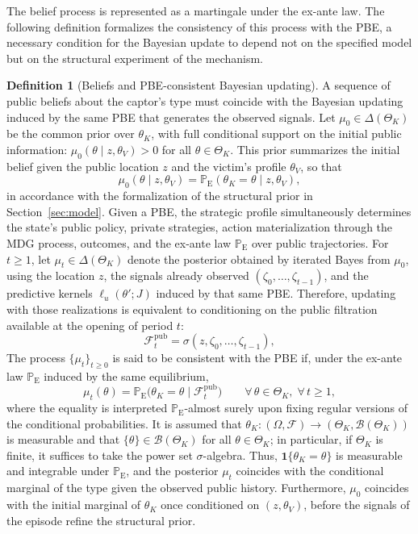 \documentclass[review,authoryear,12pt]{elsarticle}
\theoremstyle{plain}
\theoremstyle{definition}
\newtheorem{definition}[theorem]{Definition}
\newcommand{\ProbE}{\mathbb{P}_{\mathrm{E}}}
\newcommand{\ThetaK}{\Theta_K}
\newcommand{\1}{\mathbf{1}}
\begin{document}
The belief process is represented as a martingale under the ex-ante law. The following definition formalizes the consistency of this process with the PBE, a necessary condition for the Bayesian update to depend not on the specified model but on the structural experiment of the mechanism.

\begin{definition}[Beliefs and PBE-consistent Bayesian updating]\label{def:beliefs-martingale}
A sequence of public beliefs about the captor's type must coincide with the Bayesian updating induced by the same PBE that generates the observed signals. Let $\mu_0\in\Delta(\ThetaK)$ be the common prior over $\theta_K$, with full conditional support on the initial public information: $\mu_0(\theta \mid z,\theta_V)>0$ for all $\theta\in\ThetaK$. This prior summarizes the initial belief given the public location $z$ and the victim's profile $\theta_V$, so that
\[
\mu_0(\theta \mid z,\theta_V)=\ProbE(\theta_K=\theta\mid z,\theta_V),
\]
in accordance with the formalization of the structural prior in Section~\ref{sec:model}. Given a PBE, the strategic profile simultaneously determines the state's public policy, private strategies, action materialization through the MDG process, outcomes, and the ex-ante law $\ProbE$ over public trajectories. For $t\ge 1$, let $\mu_t\in\Delta(\ThetaK)$ denote the posterior obtained by iterated Bayes from $\mu_0$, using the location $z$, the signals already observed $(\zeta_0,\ldots,\zeta_{t-1})$, and the predictive kernels $\ell_u(\theta';J)$ induced by that same PBE. Therefore, updating with those realizations is equivalent to conditioning on the public filtration available at the opening of period $t$:
\[
\mathcal{F}_t^{\mathrm{pub}}=\sigma(z,\zeta_0,\ldots,\zeta_{t-1}),
\]
The process $\{\mu_t\}_{t\ge 0}$ is said to be consistent with the PBE if, under the ex-ante law $\ProbE$ induced by the same equilibrium,
\begin{equation}
\label{eq:beliefs-ebp-consistency}
\mu_t(\theta)=\ProbE\bigl(\theta_K=\theta\mid\mathcal{F}_t^{\mathrm{pub}}\bigr)\qquad \forall\,\theta\in\ThetaK,\;\forall\,t\ge 1,
\end{equation}
where the equality is interpreted $\ProbE$-almost surely upon fixing regular versions of the conditional probabilities. It is assumed that $\theta_K:(\Omega,\mathcal{F})\to(\ThetaK,\mathcal{B}(\ThetaK))$ is measurable and that $\{\theta\}\in\mathcal{B}(\ThetaK)$ for all $\theta\in\ThetaK$; in particular, if $\ThetaK$ is finite, it suffices to take the power set $\sigma$-algebra. Thus, $\mathbf{1}\{\theta_K=\theta\}$ is measurable and integrable under $\ProbE$, and the posterior $\mu_t$ coincides with the conditional marginal of the type given the observed public history. Furthermore, $\mu_0$ coincides with the initial marginal of $\theta_K$ once conditioned on $(z, \theta_V)$, before the signals of the episode refine the structural prior.
\end{definition}
\end{document}
